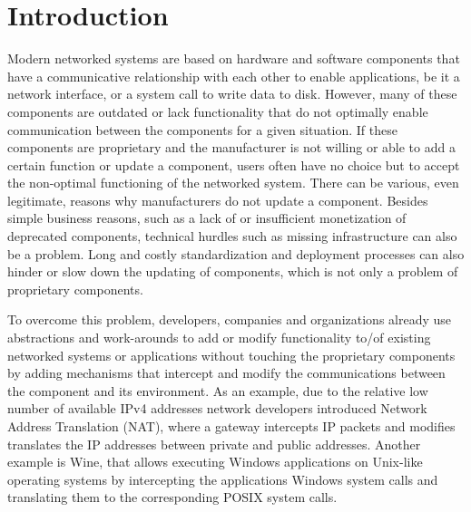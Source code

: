 \section{Introduction}
\label{sec:intro}

Modern networked systems are based on hardware and software components that have a communicative relationship with each other to enable applications, be it a network interface, or a system call to write data to disk.
However, many of these components are outdated or lack functionality that do not optimally enable communication between the components for a given situation.
If these components are proprietary and the manufacturer is not willing or able to add a certain function or update a component, users often have no choice but to accept the non-optimal functioning of the networked system.
There can be various, even legitimate, reasons why manufacturers do not update a component.
Besides simple business reasons, such as a lack of or insufficient monetization of deprecated components, technical hurdles such as missing infrastructure can also be a problem.
Long and costly standardization and deployment processes can also hinder or slow down the updating of components, which is not only a problem of proprietary components.

To overcome this problem, developers, companies and organizations already use abstractions and work-arounds to add or modify functionality to/of existing networked systems or applications without touching the proprietary components by adding mechanisms that intercept and modify the communications between the component and its environment.
As an example, due to the relative low number of available IPv4 addresses network developers introduced Network Address Translation (NAT), where a gateway intercepts IP packets and modifies translates the IP addresses between private and public addresses.
Another example is Wine, that allows executing Windows applications on Unix-like operating systems by intercepting the applications Windows system calls and translating them to the corresponding POSIX system calls.

